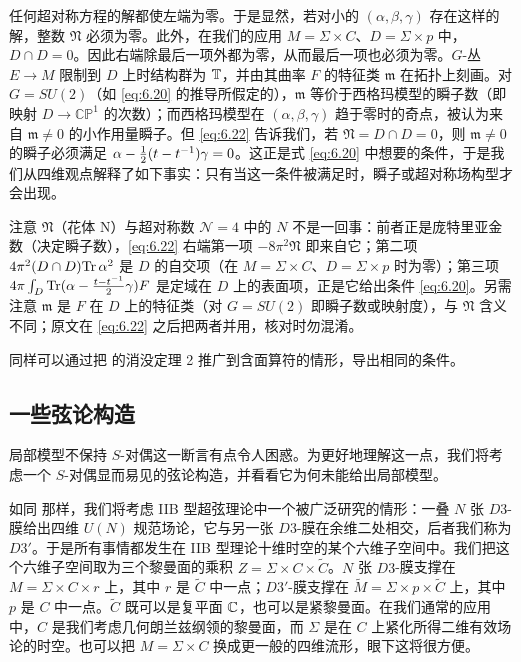 任何超对称方程的解都使左端为零。于是显然，若对小的 $(\alpha,\beta,\gamma)$ 存在这样的解，整数 $\mathfrak{N}$ 必须为零。此外，在我们的应用 $M=\Sigma\times C$、$D=\Sigma\times p$ 中，$D\cap D=0$。因此右端除最后一项外都为零，从而最后一项也必须为零。$G$-丛 $E\to M$ 限制到 $D$ 上时结构群为 ${\mathbb{T}}$，并由其曲率 $F$ 的特征类 $\mathfrak{m}$ 在拓扑上刻画。对 $G=SU(2)$（如 \eqref{eq:6.20} 的推导所假定的），$\mathfrak{m}$ 等价于西格玛模型的瞬子数（即映射 $D\to\mathbb{CP}^1$ 的次数）；而西格玛模型在 $(\alpha,\beta,\gamma)$ 趋于零时的奇点，被认为来自 $\mathfrak{m}\not=0$ 的小作用量瞬子。但 \eqref{eq:6.22} 告诉我们，若 $\mathfrak{N}=D\cap D=0$，则 $\mathfrak{m}\not=0$ 的瞬子必须满足 $\alpha-{1\over 2}(t-t^{-1})\gamma=0$。这正是式 \eqref{eq:6.20} 中想要的条件，于是我们从四维观点解释了如下事实：只有当这一条件被满足时，瞬子或超对称场构型才会出现。

\begin{yizhu}[易错点]注意 $\mathfrak{N}$（花体 N）与超对称数 ${\mathcal N}=4$ 中的 $N$ 不是一回事：前者正是庞特里亚金数（决定瞬子数），\eqref{eq:6.22} 右端第一项 $-8\pi^2\mathfrak{N}$ 即来自它；第二项 $4\pi^2(D\cap D){\rm Tr}\,\alpha^2$ 是 $D$ 的自交项（在 $M=\Sigma\times C$、$D=\Sigma\times p$ 时为零）；第三项 $4\pi\int_D{\rm Tr}(\alpha-{t-t^{-1}\over 2}\gamma)F$ 是定域在 $D$ 上的表面项，正是它给出条件 \eqref{eq:6.20}。另需注意 $\mathfrak{m}$ 是 $F$ 在 $D$ 上的特征类（对 $G=SU(2)$ 即瞬子数或映射度），与 $\mathfrak{N}$ 含义不同；原文在 \eqref{eq:6.22} 之后把两者并用，核对时勿混淆。\end{yizhu}

同样可以通过把 \cite{ref8} 的消没定理 2 推广到含面算符的情形，导出相同的条件。



\subsection{一些弦论构造}

\label{sec:6.4}

局部模型不保持 $S$-对偶这一断言有点令人困惑。为更好地理解这一点，我们将考虑一个 $S$-对偶显而易见的弦论构造，并看看它为何未能给出局部模型。

如同 \cite{ref18} 那样，我们将考虑 IIB 型超弦理论中一个被广泛研究的情形：一叠 $N$ 张 $D3$-膜给出四维 $U(N)$ 规范场论，它与另一张 $D3$-膜在余维二处相交，后者我们称为 $D3'$。于是所有事情都发生在 IIB 型理论十维时空的某个六维子空间中。我们把这个六维子空间取为三个黎曼面的乘积 $Z=\Sigma\times C\times\tilde C$。$N$ 张 $D3$-膜支撑在 $M=\Sigma\times C\times r$ 上，其中 $r$ 是 $\tilde C$ 中一点；$D3'$-膜支撑在 $\tilde M=\Sigma\times p\times \tilde C$ 上，其中 $p$ 是 $C$ 中一点。$\tilde C$ 既可以是复平面 ${\mathbb{C}}$，也可以是紧黎曼面。在我们通常的应用中，$C$ 是我们考虑几何朗兰兹纲领的黎曼面，而 $\Sigma$ 是在 $C$ 上紧化所得二维有效场论的时空。也可以把 $M=\Sigma\times C$ 换成更一般的四维流形，眼下这将很方便。

